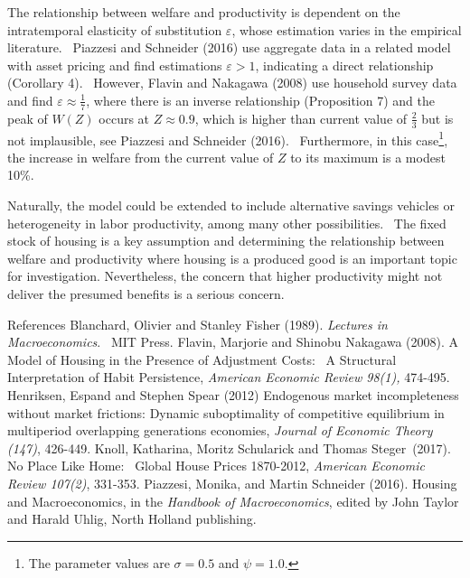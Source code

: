 \documentclass{article}
\begin{document}
\begin{doublespace}
The relationship between welfare and productivity is dependent on the
intratemporal elasticity of substitution $\varepsilon $, whose estimation
varies in the empirical literature. \ Piazzesi and Schneider (2016) use
aggregate data in a related model with asset pricing and find estimations $%
\varepsilon >1$, indicating a direct relationship (Corollary 4). \ However,
Flavin and Nakagawa (2008) use household survey data and find $\varepsilon
\approx \frac{1}{7}$, where there is an inverse relationship (Proposition 7)
and the peak of $W\left( Z\right) $ occurs at $Z\approx 0.9$, which is
higher than current value of $\frac{2}{3}$ but is not implausible, see
Piazzesi and Schneider (2016). \ Furthermore, in this case\footnote{%
The parameter values are $\sigma =0.5$ and $\psi =1.0$.}, the increase in
welfare from the current value of $Z$ to its maximum is a modest 10\%.

Naturally, the model could be extended to include alternative savings
vehicles or heterogeneity in labor productivity, among many other
possibilities. \ The fixed stock of housing is a key assumption and
determining the relationship between welfare and productivity where housing
is a produced good is an important topic for investigation. Nevertheless,
the concern that higher productivity might not deliver the presumed benefits
is a serious concern.

\bigskip

\end{doublespace}%
{\Large References} \bigskip \newline
Blanchard, Olivier and Stanley Fisher (1989). \textit{Lectures in
Macroeconomics}. \ MIT Press.\bigskip \newline
Flavin, Marjorie and Shinobu Nakagawa (2008). A Model of Housing in the
Presence of Adjustment Costs: \ A Structural Interpretation of Habit
Persistence, \textit{American Economic Review 98(1), }474-495.\bigskip 
\newline
Henriksen, Espand and Stephen Spear (2012) Endogenous market incompleteness
without market frictions: Dynamic suboptimality of competitive equilibrium
in multiperiod overlapping generations economies, \textit{Journal of
Economic Theory} \textit{(147)}, 426-449.\bigskip \newline
Knoll, Katharina, Moritz Schularick and Thomas Steger\ (2017). No Place Like
Home: \ Global House Prices 1870-2012, \textit{American Economic Review
107(2)}, 331-353.\bigskip \newline
Piazzesi, Monika, and Martin Schneider (2016). Housing and Macroeconomics,
in the \textit{Handbook of Macroeconomics}, edited by John Taylor and Harald
Uhlig, North Holland publishing.
\end{document}
